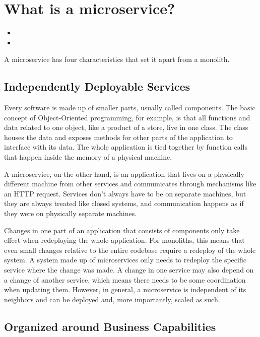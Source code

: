 \section{What is a microservice?}


\begin{itemize}
  \item {}
  \item {}
\end{itemize}

A microservice has four characteristics that set it apart from a monolith.

\subsection{Independently Deployable Services}

Every software is made up of smaller parts, usually called components. The basic concept of Object-Oriented programming, for example, is that all functions and data related to one object, like a product of a store, live in one class. The class houses the data and exposes methods for other parts of the application to interface with its data. The whole application is tied together by function calls that happen inside the memory of a physical machine.

A microservice, on the other hand, is an application that lives on a physically different machine from other services and communicates through mechanisms like an HTTP request. Services don't always have to be on separate machines, but they are always treated like closed systems, and communication happens as if they were on physically separate machines.

Changes in one part of an application that consists of components only take effect when redeploying the whole application. For monoliths, this means that even small changes relative to the entire codebase require a redeploy of the whole system. A system made up of microservices only needs to redeploy the specific service where the change was made. A change in one service may also depend on a change of another service, which means there needs to be some coordination when updating them. However, in general, a microservice is independent of its neighbors and can be deployed and, more importantly, scaled as such.


\subsection{Organized around Business Capabilities}

